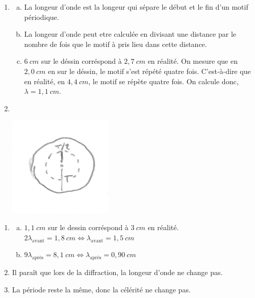 \documentclass[12pt, a4paper]{article}
\begin{document}
    \begin{Exercise}[number={30}]
        \begin{enumerate}[1.]
            \item   \begin{enumerate}[a.]
                        \item La longeur d'onde est la longeur qui sépare le début et le fin d'un motif périodique.
                        \item La longeur d'onde peut etre calculée en divisant une distance par le nombre de fois que le motif à pris lieu dans cette distance.
                        \item $6\ \si{cm}$ sur le déssin corréspond à $2{,}7\ \si{cm}$ en réalité. On mesure que en $2{,}0\ \si{cm}$ en sur le déssin, le motif s'est répété quatre fois. C'est-à-dire que en réalité, en $4{,}4\ \si{cm}$, le motif se répète quatre fois. On calcule donc, $\lambda=1{,}1\ \si{cm}$.
                    \end{enumerate}
            \item \ \\\parbox{\linewidth}{
                        \centering
                        \includegraphics[width=5cm]{EX30img1.jpg}
                    } \bigbreak
        \end{enumerate}
    \end{Exercise}

    \begin{Exercise}[number={32}]
        \begin{enumerate}[1.]
            \item   \begin{enumerate}[a.]
                \item $1{,}1\ \si{cm}$ sur le dessin corréspond à $3\ \si{cm}$ en réalité. \\ $2\lambda_\text{avant}=1{,}8\ \si{cm} \iff \lambda_\text{avant}=1{,}5\ \si{cm}$
                \item $9\lambda_\text{après}=8{,}1\ \si{cm} \iff \lambda_\text{après}=0{,}90\ \si{cm}$
            \end{enumerate}
            \item Il paraît que lors de la diffraction, la longeur d'onde ne change pas.
            \item La période reste la même, donc la célérité ne change pas.
        \end{enumerate}
    \end{Exercise}
\end{document}

